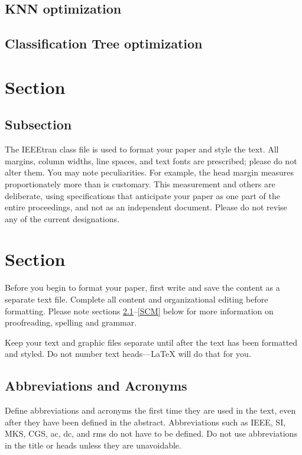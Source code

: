\documentclass[conference]{IEEEtran}
\begin{document}
\subsection{KNN optimization}

\subsection{Classification Tree optimization}


\section{Section}

\subsection{Subsection}

The IEEEtran class file is used to format your paper and style the text. All margins, 
column widths, line spaces, and text fonts are prescribed; please do not 
alter them. You may note peculiarities. For example, the head margin
measures proportionately more than is customary. This measurement 
and others are deliberate, using specifications that anticipate your paper 
as one part of the entire proceedings, and not as an independent document. 
Please do not revise any of the current designations.

\section{Section}
Before you begin to format your paper, first write and save the content as a 
separate text file. Complete all content and organizational editing before 
formatting. Please note sections \ref{AA}--\ref{SCM} below for more information on 
proofreading, spelling and grammar.

Keep your text and graphic files separate until after the text has been 
formatted and styled. Do not number text heads---{\LaTeX} will do that 
for you.

\subsection{Abbreviations and Acronyms}\label{AA}
Define abbreviations and acronyms the first time they are used in the text, 
even after they have been defined in the abstract. Abbreviations such as 
IEEE, SI, MKS, CGS, ac, dc, and rms do not have to be defined. Do not use 
abbreviations in the title or heads unless they are unavoidable.
\end{document}
